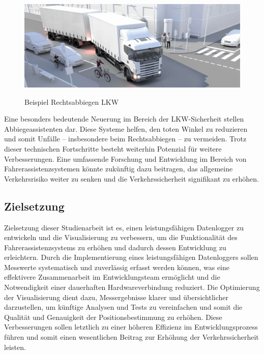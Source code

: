 \documentclass[a4paper, 12pt]{article} %
\begin{document}
\begin{figure}[H]
    \includegraphics[width=1\linewidth]{images/abbiegeassistent-scaled-7b2478b8}\\[1ex]
    \centering
    \caption{Beispiel Rechtsabbiegen LKW}
    \label{ABBILDUNG}
\end{figure}


Eine besonders bedeutende Neuerung im Bereich der \acf{LKW}-Sicherheit stellen Abbiegeassistenten dar. 
Diese Systeme helfen, den toten Winkel zu reduzieren und somit Unfälle – insbesondere beim Rechtsabbiegen – zu vermeiden. 
Trotz dieser technischen Fortschritte besteht weiterhin Potenzial für weitere Verbesserungen. Eine umfassende Forschung und Entwicklung 
im Bereich von Fahrerassistenzsystemen könnte zukünftig dazu beitragen, das allgemeine Verkehrsrisiko weiter zu senken und die Verkehrssicherheit
signifikant zu erhöhen.

\clearpage

\subsection{Zielsetzung}
Zielsetzung dieser Studienarbeit ist es, einen 
leistungsfähigen Datenlogger zu entwickeln und die Visualisierung 
zu verbessern, um die Funktionalität des Fahrerassistenzsystems zu erhöhen 
und dadurch dessen Entwicklung zu erleichtern. Durch die Implementierung eines 
leistungsfähigen Datenloggers sollen Messwerte systematisch und zuverlässig 
erfasst werden können, was eine effektivere Zusammenarbeit im Entwicklungsteam 
ermöglicht und die Notwendigkeit einer dauerhaften Hardwareverbindung reduziert. Die Optimierung der Visualisierung 
dient dazu, Messergebnisse klarer und übersichtlicher darzustellen, um künftige Analysen und Tests zu vereinfachen und somit
 die Qualität und Genauigkeit der Positionsbestimmung zu erhöhen. Diese Verbesserungen sollen letztlich zu einer höheren Effizienz
  im Entwicklungsprozess führen und 
somit einen wesentlichen Beitrag zur Erhöhung der Verkehrssicherheit leisten.
\end{document}
